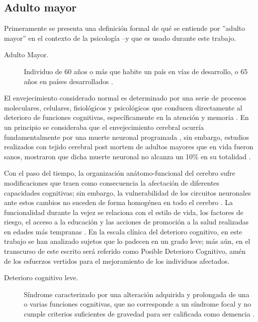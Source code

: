\documentclass[12pt,a4paper]{mitthesis}
\begin{document}
\subsection{Adulto mayor}

Primeramente se presenta una definici\'on formal de qu\'e se entiende por ''adulto mayor'' en el 
contexto de la psicolog\'ia --y que es usado durante este trabajo.

\begin{description}
\item[Adulto Mayor.] Individuo de 60 a\~nos o m\'as que habite un pa\'is en v\'ias de desarrollo, o 
65 a\~nos en pa\'ises desarrollados \cite{Hita14}.
\end{description}

El envejecimiento considerado normal es determinado por una serie de procesos moleculares, 
celulares, fisiol\'ogicos y psicol\'ogicos que conducen directamente al deterioro de funciones 
cognitivas, específicamente en la atenci\'on y memoria \cite{Navarrete03,Park09}. 
En un principio se consideraba que el envejecimiento cerebral ocurr\'ia fundamentalmente por una 
muerte neuronal programada \cite{Coleman87}, sin embargo, estudios realizados con tejido cerebral 
post mortem de adultos mayores que en vida fueron sanos, mostraron que dicha muerte neuronal no 
alcanza un 10\% en su totalidad \cite{Esiri07}. 

Con el paso del tiempo, la organizaci\'on an\'atomo-funcional del cerebro sufre modificaciones que 
traen como consecuencia la afectaci\'on de diferentes capacidades cognitivas; sin embargo, la 
vulnerabilidad de los circuitos neuronales ante estos cambios no suceden de forma homog\'enea en 
todo el cerebro \cite{Hita14}.
La funcionalidad durante la vejez se relaciona con el estilo de vida, los factores de riesgo, el 
acceso a la educaci\'on y las acciones de promoci\'on a la salud realizadas en edades m\'as 
tempranas \cite{Ohayon04,Sanhueza14}.
En la escala cl\'inica del deterioro cognitivo, en este trabajo se han analizado sujetos que lo
padecen en un grado leve; m\'as a\'un, en el transcurso de este escrito ser\'a referido como 
Posible Deterioro Cognitivo, am\'en de los esfuerzos vertidos para el mejoramiento de los 
individuos afectados.

\begin{description}
\item[Deterioro cognitivo leve.] S\'indrome caracterizado por una alteraci\'on adquirida y 
prolongada de una o varias funciones cognitivas, que no corresponde a un s\'indrome focal y no 
cumple criterios suficientes de gravedad para ser calificada como demencia \cite{Robles02}.
\end{description}
\end{document}
